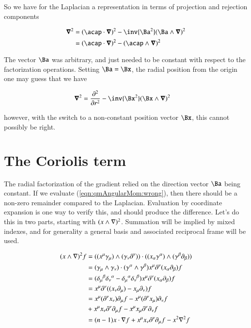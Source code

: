 So we have for the Laplacian a representation in terms of projection and rejection components 

\begin{align*}
\spacegrad^2
&=
(\acap \cdot \spacegrad)^2 - \inv{\Ba^2} (\Ba \wedge \spacegrad)^2 \\
&=
(\acap \cdot \spacegrad)^2 - (\acap \wedge \spacegrad)^2 \\
\end{align*}

The vector $\Ba$ was arbitrary, and just needed to be constant with respect to the factorization operations.  Setting $\Ba = \Bx$, the radial position from the origin one may guess that we have

\begin{align}\label{eqn:qmAngularMom:wrong}
\spacegrad^2 &= \frac{\partial^2 }{\partial r^2} - \inv{\Bx^2} (\Bx \wedge \spacegrad)^2 
\end{align}

however, with the switch to a non-constant position vector $\Bx$, this cannot possibly be right.

\section{The Coriolis term}

The radial factorization of the gradient relied on the direction vector $\Ba$ being constant.  If we evaluate (\ref{eqn:qmAngularMom:wrong}), then there should be a non-zero remainder compared to the Laplacian.  Evaluation by coordinate expansion is one way to verify this, and should produce the difference.  Let's do this in two parts, starting with $(x \wedge \nabla)^2$.  Summation will be implied by mixed indexes, and for generality a general basis and associated reciprocal frame will be used.

\begin{align*}
(x \wedge \nabla)^2 f 
&=
((x^\mu \gamma_\mu) \wedge (\gamma_\nu \partial^\nu)) \cdot 
((x_\alpha \gamma^\alpha) \wedge (\gamma^\beta \partial_\beta)) \\
&=
(\gamma_\mu \wedge \gamma_\nu) \cdot (\gamma^\alpha \wedge \gamma^\beta) x^\mu \partial^\nu (x_\alpha \partial_\beta) f \\
&=
({\delta_\mu}^\beta {\delta_\nu}^\alpha -{\delta_\mu}^\alpha {\delta_\nu}^\beta) x^\mu \partial^\nu (x_\alpha \partial_\beta) f \\
&=
x^\mu \partial^\nu ((x_\nu \partial_\mu) - x_\mu \partial_\nu) f \\
&=
x^\mu (\partial^\nu x_\nu) \partial_\mu f - x^\mu (\partial^\nu x_\mu) \partial_\nu f \\
&+x^\mu x_\nu \partial^\nu \partial_\mu f - x^\mu x_\mu \partial^\nu \partial_\nu f \\
&=
(n-1) x \cdot \nabla f +x^\mu x_\nu \partial^\nu \partial_\mu f - x^2 \nabla^2 f \\
\end{align*}

